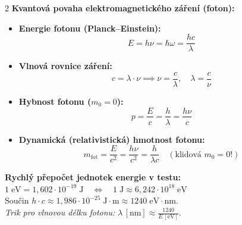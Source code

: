 \documentclass[9pt,a4paper]{article}
\begin{document}
\begin{tcolorbox}[secbox,title=1. FUNDAMENTÁLNÍ FYZIKÁLNÍ KONSTANTY A ZÁKLADNÍ KVANTOVÉ VZTAHY]
\begin{multicols}{2}
\textbf{Kvantová povaha elektromagnetického záření (foton):}
\begin{itemize}
  \item \textbf{Energie fotonu (Planck--Einstein):}
  \[E = h\nu = \hbar\omega = \frac{hc}{\lambda}\]
  \item \textbf{Vlnová rovnice záření:}
  \[c = \lambda \cdot \nu \implies \nu = \frac{c}{\lambda}, \quad \lambda = \frac{c}{\nu}\]
  \item \textbf{Hybnost fotonu ($m_0 = 0$):}
  \[p = \frac{E}{c} = \frac{h}{\lambda} = \frac{h\nu}{c}\]
  \item \textbf{Dynamická (relativistická) hmotnost fotonu:}
  \[m_{\text{fot}} = \frac{E}{c^2} = \frac{h\nu}{c^2} = \frac{h}{\lambda c} \quad (\text{klidová } m_0 = 0!)\]
\end{itemize}

\begin{tcolorbox}[rulebox]
\textbf{Rychlý přepočet jednotek energie v testu:}\\
$1\;\text{eV} = 1{,}602 \cdot 10^{-19}\;\text{J} \quad \Longleftrightarrow \quad 1\;\text{J} \approx 6{,}242 \cdot 10^{18}\;\text{eV}$\\
Součin $h \cdot c \approx 1{,}986 \cdot 10^{-25}\;\text{J}\cdot\text{m} \approx 1240\;\text{eV}\cdot\text{nm}$.\\
\emph{Trik pro vlnovou délku fotonu:} $\lambda\,[\text{nm}] \approx \frac{1240}{E\,[\text{eV}]}$.
\end{tcolorbox}

\end{multicols}
\end{tcolorbox}
\end{document}
